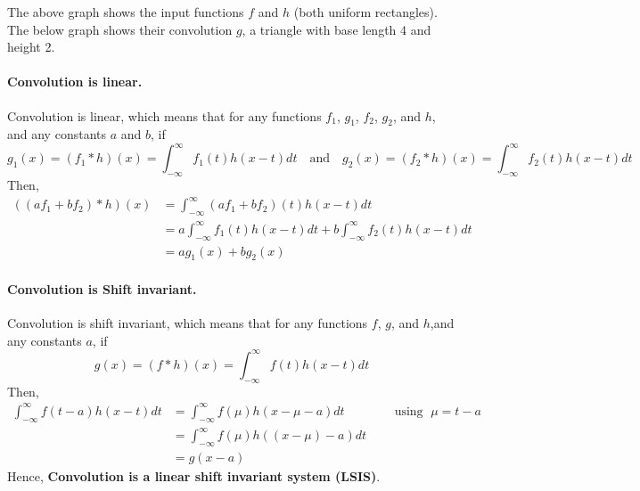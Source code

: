 {\begin{center}
\end{center}
\noindent
The above graph shows the input functions \(f\) and \(h\) (both uniform rectangles). The below graph shows their convolution \(g\), a triangle with base length 4 and height 2.
}

\paragraph{Convolution is linear.} Convolution is linear, which means that for any functions \(f_1\), \(g_1\), \(f_2\), \(g_2\), and \(h\), and any constants \(a\) and \(b\), if 
\[
    g_1(x) = (f_1*h)(x) = \int_{-\infty}^{\infty} f_1(t)h(x-t)dt \quad \text{and} \quad g_2(x) = (f_2*h)(x) = \int_{-\infty}^{\infty} f_2(t)h(x-t)dt
\]
Then, 
\begin{align*}
    ((a f_1 + b f_2) * h )(x) &= \int_{-\infty}^{\infty} (a f_1 + b f_2)(t)h(x-t)dt\\
    &= a \int_{-\infty}^{\infty} f_1(t)h(x-t)dt  + b \int_{-\infty}^{\infty}  f_2(t)h(x-t)dt\\
    &= a g_1(x) + b g_2(x)
\end{align*}


\paragraph{Convolution is Shift invariant.} Convolution is shift invariant, which means that for any functions \(f\), \(g\), and \(h\),and any constants \(a\), if 
\[
    g(x) = (f*h)(x) = \int_{-\infty}^{\infty} f(t)h(x-t)dt
\]
Then, 
\begin{align*}
    \int_{-\infty}^{\infty} f(t - a )h(x-t)dt &= \int_{-\infty}^{\infty} f(\mu)h(x - \mu - a)dt \qquad \qquad \text{using }\; \mu = t - a\\ 
    &= \int_{-\infty}^{\infty} f(\mu)h((x - \mu) - a)dt\\ 
    &= g(x - a)
\end{align*}
Hence, {\bf Convolution is a linear shift invariant system (LSIS)}.

